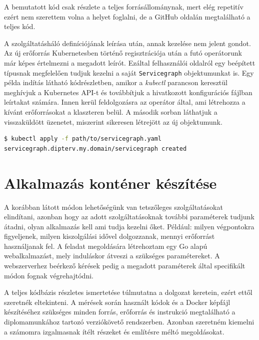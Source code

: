 A bemutatott kód csak részlete a teljes forrásállománynak, mert elég repetitív ezért nem szerettem volna a helyet foglalni, de a GitHub oldalán megtalálható a teljes kód. \\

\lstset{caption=Saját szolgáltatásháló definiálása, label=servicegraph_example}


A szolgáltatásháló definíciójának leírása után, annak kezelése nem jelent gondot.
Az új erőforrás Kubernetesben történő regisztrációja után a futó operátorunk már képes értelmezni a megadott leírót.
Ezáltal felhasználói oldalról egy beépített típusnak megfelelően tudjuk kezelni a saját \verb+Servicegraph+ objektumunkat is.
Egy példa indítás látható  kódrészletben, amikor a \textit{kubectl} parancson keresztül meghívjuk a Kubernetes API-t és továbbítjuk a hivatkozott konfigurációs fájlban leírtakat számára.
Innen kerül feldolgozásra az operátor által, ami létrehozza a kívánt erőforrásokat a klaszteren belül. 
A második sorban láthatjuk a visszaküldött üzenetet, miszerint sikeresen létrejött az új objektumunk.

\lstset{caption=Szolgáltatásháló indítása, label=servicegraph_apply}
\begin{lstlisting}[language=bash,morekeywords={kubectl, apply},alsoletter={-},breaklines=true]
$ kubectl apply -f path/to/servicegraph.yaml                          
servicegraph.dipterv.my.domain/servicegraph created 
\end{lstlisting}


\section{Alkalmazás konténer készítése}
A korábban látott módon lehetőségünk van tetszőleges szolgáltatásokat elindítani, azonban hogy az adott szolgáltatásoknak további paraméterek tudjunk átadni, olyan alkalmazás kell ami tudja kezelni őket. Például: milyen végpontokra figyeljenek, milyen kiszolgálási idővel dolgozzanak, mennyi erőforrást használjanak fel.
A feladat megoldására létrehoztam egy Go alapú webalkalmazást, mely induláskor átveszi a szükséges paramétereket. A webszerverhez beérkező kérések pedig a megadott paraméterek által specifikált módon fognak végrehajtódni. 

A teljes kódbázis részletes ismertetése túlmutatna a dolgozat keretein, ezért ettől szeretnék eltekinteni.
A mérések során használt kódok és a Docker képfájl készítéséhez szükséges minden forrás, erőforrás és instrukció megtalálható a diplomamunkához tartozó verziókövető rendszerben\citep{gitRepo}. 
Azonban szeretném kiemelni a számomra izgalmasnak ítélt részeket és említésre méltó megoldásokat.

